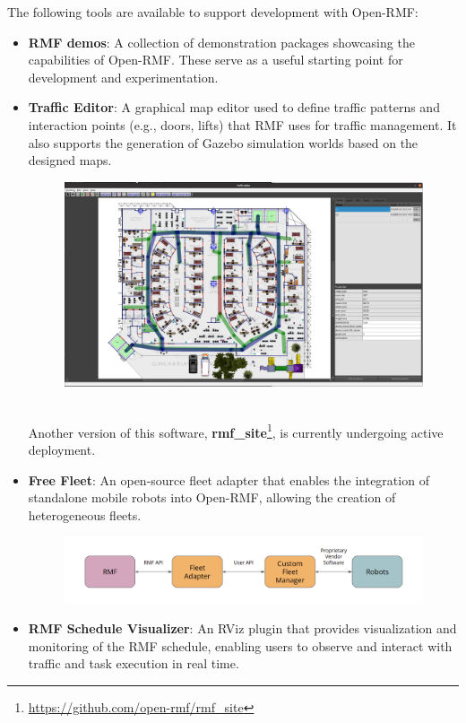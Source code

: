 The following tools are available to support development with Open-RMF:
\begin{itemize}
	\item \textbf{RMF demos}: A collection of demonstration packages showcasing the capabilities of Open-RMF. These serve as a useful starting point for development and experimentation.
	\item \textbf{Traffic Editor}: A graphical map editor used to define traffic patterns and interaction points (e.g., doors, lifts) that RMF uses for traffic management. It also supports the generation of Gazebo simulation worlds based on the designed maps.\\
	\begin{figure}[h]
		\centering
		\includegraphics[width=0.8\linewidth]{img/RMF_tut_trafficEditor.png}
		\label{fig:Traffic Editor}
	\end{figure}\\
	Another version of this software,  \textbf{rmf\_site}\footnote{\href{https://github.com/open-rmf/rmf\_site}{https://github.com/open-rmf/rmf\_site}}, is currently undergoing active deployment.
	\item \textbf{Free Fleet}: An open-source fleet adapter that enables the integration of standalone mobile robots into Open-RMF, allowing the creation of heterogeneous fleets.
	\begin{figure}[h]
		\centering
		\includegraphics[width=0.8\linewidth]{img/RMF_tut_fleetAdapterTMPL.png}
		\label{fig:Fleet Adapter}
	\end{figure}
	\item \textbf{RMF Schedule Visualizer}: An RViz plugin that provides visualization and monitoring of the RMF schedule, enabling users to observe and interact with traffic and task execution in real time.

\end{itemize}

